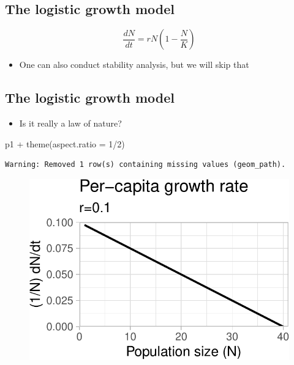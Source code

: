 \documentclass[
  letterpaper,
  DIV=11,
  numbers=noendperiod]{scrartcl}
\newenvironment{Shaded}{\begin{snugshade}}{\end{snugshade}}
\newcommand{\AttributeTok}[1]{\textcolor[rgb]{0.40,0.45,0.13}{#1}}
\newcommand{\DecValTok}[1]{\textcolor[rgb]{0.68,0.00,0.00}{#1}}
\newcommand{\FunctionTok}[1]{\textcolor[rgb]{0.28,0.35,0.67}{#1}}
\newcommand{\NormalTok}[1]{\textcolor[rgb]{0.00,0.23,0.31}{#1}}
\newcommand{\SpecialCharTok}[1]{\textcolor[rgb]{0.37,0.37,0.37}{#1}}
\providecommand{\tightlist}{%
  \setlength{\itemsep}{0pt}\setlength{\parskip}{0pt}}\usepackage{longtable,booktabs,array}
\begin{document}
\hypertarget{the-logistic-growth-model-10}{%
\subsection{The logistic growth
model}\label{the-logistic-growth-model-10}}

\[\frac{dN}{dt}=rN(1-\frac{N}{K})\]

\begin{itemize}
\tightlist
\item
  One can also conduct stability analysis, but we will skip that
\end{itemize}

\hypertarget{the-logistic-growth-model-11}{%
\subsection{The logistic growth
model}\label{the-logistic-growth-model-11}}

\begin{itemize}
\tightlist
\item
  Is it really a law of nature?
\end{itemize}

\begin{Shaded}
\begin{Highlighting}[]
\NormalTok{p1 }\SpecialCharTok{+} \FunctionTok{theme}\NormalTok{(}\AttributeTok{aspect.ratio =} \DecValTok{1}\SpecialCharTok{/}\DecValTok{2}\NormalTok{)}
\end{Highlighting}
\end{Shaded}

\begin{verbatim}
Warning: Removed 1 row(s) containing missing values (geom_path).
\end{verbatim}

\begin{figure}[H]

{\centering \includegraphics{ecological_interactions_files/figure-pdf/unnamed-chunk-9-1.pdf}

}

\end{figure}
\end{document}
